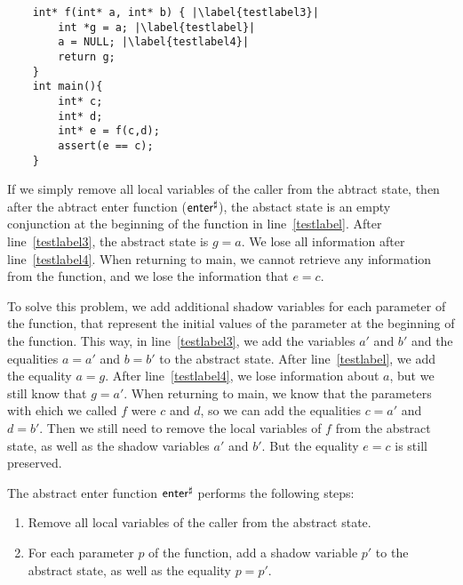 \begin{verbatim}
    int* f(int* a, int* b) { |\label{testlabel3}|
        int *g = a; |\label{testlabel}|
        a = NULL; |\label{testlabel4}|
        return g;
    }
    int main(){
        int* c;
        int* d;
        int* e = f(c,d);
        assert(e == c);
    }
\end{verbatim}

\begin{example}
If we simply remove all local variables of the caller from the abtract state, then
after the abtract enter function ($\textsf{enter}^\sharp$), the abstact state is an empty conjunction
at the beginning of the function in line~\ref{testlabel}.
After line~\ref{testlabel3}, the abstract state is $g = a$.
We lose all information after line~\ref{testlabel4}.
When returning to \textsf{main}, we cannot retrieve any information from the function,
and we lose the information that $e = c$.

To solve this problem, we add additional shadow variables for each parameter of the function,
that represent the initial values of the parameter at the beginning of the function.
This way, in line~\ref{testlabel3}, we add the variables $a'$ and $b'$ and the equalities $a = a'$ and $b = b'$
to the abstract state.
After line~\ref{testlabel}, we add the equality $a = g$.
After line~\ref{testlabel4}, we lose information about $a$, but we still know that $g = a'$.
When returning to \textsf{main},
we know that the parameters with ehich we called $f$ were $c$ and $d$,
so we can add the equalities $c = a'$ and $d = b'$.
Then we still need to remove the local variables of $f$ from the abstract state,
as well as the shadow variables $a'$ and $b'$.
But the  equality $e = c$ is still preserved.
\end{example}

The abstract enter function $\textsf{enter}^\sharp$ performs the following steps:
\begin{enumerate}
    \item Remove all local variables of the caller from the abstract state.
    \item For each parameter $p$ of the function, add a shadow variable $p'$ to the abstract state,
as well as the equality $p = p'$.
\end{enumerate}

